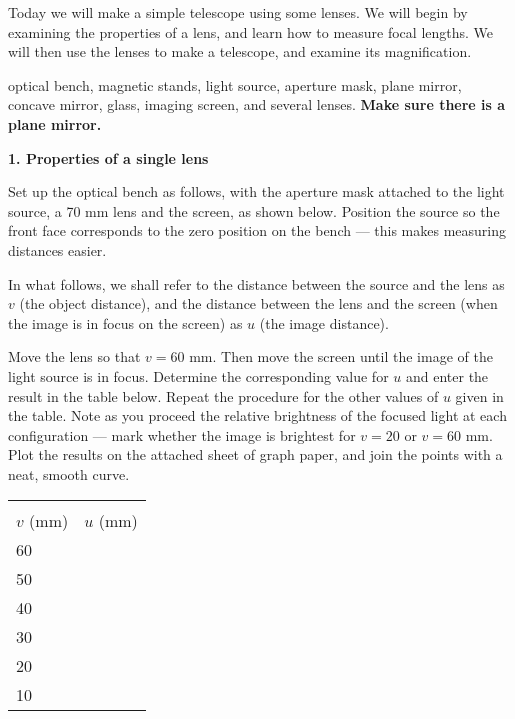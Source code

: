 
\noindent Today we will make a simple telescope using some lenses.  We
will begin by examining the properties of a lens, and learn how to
measure focal lengths. We will then use the lenses to make a
telescope, and examine its magnification.  

 optical bench, magnetic stands, light
source, aperture mask, plane mirror, concave mirror, glass,
imaging screen, and several lenses. {\bf Make sure there is a plane
mirror.} 

\noindent
{\bf 1. Properties of a single lens} 

\noindent Set up the optical bench as follows, with the aperture mask
attached to the light source, a 70 mm lens and the screen, as shown
below. Position the source so the front face corresponds to the zero
position on the bench --- this makes measuring distances easier.

\begin{figure*}[h]
\centerline{}
\caption{}
\end{figure*}

\noindent In what follows, we shall refer to the distance between the
source and the lens as $v$ (the object distance), and the distance
between the lens and the screen (when the image is in focus on the
screen) as $u$ (the image distance). 

\noindent Move the lens so that $v= 60$ mm.  Then move the screen
until the image of the light source is in focus.  Determine the
corresponding value for $u$ and enter the result in the table below.
Repeat the procedure for the other values of $u$ given in the table.
Note as you proceed the relative brightness of the focused light at
each configuration --- mark whether the image is brightest for $v=20$
or $v=60$ mm.  Plot the results on the attached sheet of graph paper,
and join the points with a neat, smooth curve.
 
\begin{center}
\begin{tabular}{lc} \hline \\ [-6pt]
$v$ (mm)  & \hspace{1cm} $u$ (mm) \hspace{1cm} \\ [6pt]
\hline
60 &        \\ \hline
50 &        \\ \hline
40 &        \\ \hline
30 &        \\ \hline
20 &        \\ \hline
10 &        \\ \hline
\end{tabular}
\end{center}

